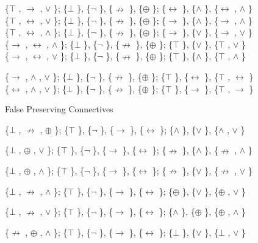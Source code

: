 \{$\top$ , $\to$ , $\lor$ \}; \{$\bot$ \}, \{$\neg$ \}, \{$\nrightarrow$ \}, \{$\oplus$ \}; \{$\leftrightarrow$ \}, \{$\land$ \}, \{$\leftrightarrow$ , $\land$ \}\\
\{$\top$ , $\leftrightarrow$ , $\lor$ \}; \{$\bot$ \}, \{$\neg$ \}, \{$\nrightarrow$ \}, \{$\oplus$ \}; \{$\to$ \}, \{$\land$ \}, \{$\to$ , $\land$ \}\\
\{$\top$ , $\leftrightarrow$ , $\land$ \}; \{$\bot$ \}, \{$\neg$ \}, \{$\nrightarrow$ \}, \{$\oplus$ \}; \{$\to$ \}, \{$\lor$ \}, \{$\to$ , $\lor$ \}\\
\{$\to$ , $\leftrightarrow$ , $\land$ \}; \{$\bot$ \}, \{$\neg$ \}, \{$\nrightarrow$ \}, \{$\oplus$ \}; \{$\top$ \}, \{$\lor$ \}, \{$\top$ , $\lor$ \}\\
\{$\to$ , $\leftrightarrow$ , $\lor$ \}; \{$\bot$ \}, \{$\neg$ \}, \{$\nrightarrow$ \}, \{$\oplus$ \}; \{$\top$ \}, \{$\land$ \}, \{$\top$ , $\land$ \}

\{$\to$ , $\land$ , $\lor$ \}; \{$\bot$ \}, \{$\neg$ \}, \{$\nrightarrow$ \}, \{$\oplus$ \}; \{$\top$ \}, \{$\leftrightarrow$ \}, \{$\top$ , $\leftrightarrow$ \}\\
\{$\leftrightarrow$ , $\land$ , $\lor$ \}; \{$\bot$ \}, \{$\neg$ \}, \{$\nrightarrow$ \}, \{$\oplus$ \}; \{$\top$ \}, \{$\to$ \}, \{$\top$ , $\to$ \}

\protect\hypertarget{anchor-17}{}{}False Preserving Connectives

\{$\bot$ , $\nrightarrow$ , $\oplus$ \}; \{$\top$ \}, \{$\neg$ \}, \{$\to$ \}, \{$\leftrightarrow$ \}; \{$\land$ \}, \{$\lor$ \}, \{$\land$ , $\lor$ \}

\{$\bot$ , $\oplus$ , $\lor$ \}; \{$\top$ \}, \{$\neg$ \}, \{$\to$ \}, \{$\leftrightarrow$ \}; \{$\nrightarrow$ \}, \{$\land$ \}, \{$\nrightarrow$ , $\land$ \}

\{$\bot$ , $\oplus$ , $\land$ \}; \{$\top$ \}, \{$\neg$ \}, \{$\to$ \}, \{$\leftrightarrow$ \}; \{$\nrightarrow$ \}, \{$\lor$ \}, \{$\nrightarrow$ , $\lor$ \}

\{$\bot$ , $\nrightarrow$ , $\land$ \}; \{$\top$ \}, \{$\neg$ \}, \{$\to$ \}, \{$\leftrightarrow$ \}; \{$\oplus$ \}, \{$\lor$ \}, \{$\oplus$ , $\lor$ \}

\{$\bot$ , $\nrightarrow$ , $\lor$ \}; \{$\top$ \}, \{$\neg$ \}, \{$\to$ \}, \{$\leftrightarrow$ \}; \{$\land$ \}, \{$\oplus$ \}, \{$\oplus$ , $\land$ \}

\{$\nrightarrow$ , $\oplus$ , $\land$ \}; \{$\top$ \}, \{$\neg$ \}, \{$\to$ \}, \{$\leftrightarrow$ \}; \{$\bot$ \}, \{$\lor$ \}, \{$\bot$ , $\lor$ \}

